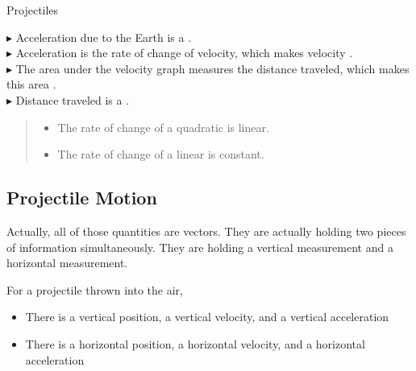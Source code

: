 \documentclass{ximera}
\begin{document}
\begin{summary} Projectiles



$\blacktriangleright$ Acceleration due to the Earth is a . \\

$\blacktriangleright$ Acceleration is the rate of change of velocity, which makes velocity . \\

$\blacktriangleright$ The area under the velocity graph measures the distance traveled, which makes this area . \\

$\blacktriangleright$ Distance traveled is a . \\




\begin{quote}
\begin{itemize}
\item The rate of change of a quadratic is linear.
\item The rate of change of a linear is constant.
\end{itemize}
\end{quote}



\end{summary}








\subsection*{Projectile Motion}


Actually, all of those quantities are vectors.  They are actually holding two pieces of information simultaneously. They are holding a vertical measurement and a horizontal measurement. \\

\begin{observation}
For a projectile thrown into the air, 
\begin{itemize}
\item There is a vertical position, a vertical velocity, and a vertical acceleration
\item There is a horizontal position, a horizontal velocity, and a horizontal acceleration
\end{itemize}
\end{observation}
\end{document}
